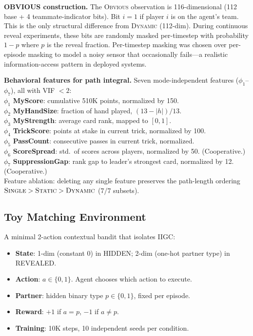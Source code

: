\documentclass[letterpaper]{article}
\begin{document}
\medskip
\noindent\textbf{OBVIOUS construction.}
The \textsc{Obvious} observation is 116-dimensional (112 base + 4 teammate-indicator bits).
Bit $i=1$ if player $i$ is on the agent's team. This is the only structural
difference from \textsc{Dynamic} (112-dim).
During continuous reveal experiments, these bits are randomly masked per-timestep
with probability $1-p$ where $p$ is the reveal fraction.
Per-timestep masking was chosen over per-episode masking to model a noisy sensor
that occasionally fails---a realistic information-access pattern in deployed systems.

\medskip
\noindent\textbf{Behavioral features for path integral.}
Seven mode-independent features ($\phi_1$--$\phi_7$), all with VIF $< 2$:\\
$\phi_1$ \textbf{MyScore}: cumulative 510K points, normalized by 150.\\
$\phi_2$ \textbf{MyHandSize}: fraction of hand played, $(13 - |h|)/13$.\\
$\phi_3$ \textbf{MyStrength}: average card rank, mapped to $[0,1]$.\\
$\phi_4$ \textbf{TrickScore}: points at stake in current trick, normalized by 100.\\
$\phi_5$ \textbf{PassCount}: consecutive passes in current trick, normalized.\\
$\phi_6$ \textbf{ScoreSpread}: std.\ of scores across players, normalized by 50. (Cooperative.)\\
$\phi_7$ \textbf{SuppressionGap}: rank gap to leader's strongest card, normalized by 12. (Cooperative.)\\
Feature ablation: deleting any single feature preserves the path-length ordering
$\textsc{Single} > \textsc{Static} > \textsc{Dynamic}$ (7/7 subsets).

\subsection{Toy Matching Environment}

A minimal 2-action contextual bandit that isolates IIGC:

\begin{itemize}
\item \textbf{State}: 1-dim (constant 0) in HIDDEN; 2-dim (one-hot partner type) in REVEALED.
\item \textbf{Action}: $a \in \{0, 1\}$. Agent chooses which action to execute.
\item \textbf{Partner}: hidden binary type $p \in \{0, 1\}$, fixed per episode.
\item \textbf{Reward}: $+1$ if $a = p$, $-1$ if $a \neq p$.
\item \textbf{Training}: 10K steps, 10 independent seeds per condition.
\end{itemize}
\end{document}
